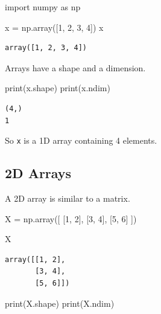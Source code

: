 \documentclass[
  letterpaper,
  DIV=11,
  numbers=noendperiod]{scrreprt}
\newenvironment{Shaded}{\begin{snugshade}}{\end{snugshade}}
\newcommand{\BuiltInTok}[1]{\textcolor[rgb]{0.00,0.23,0.31}{#1}}
\newcommand{\DecValTok}[1]{\textcolor[rgb]{0.68,0.00,0.00}{#1}}
\newcommand{\ImportTok}[1]{\textcolor[rgb]{0.00,0.46,0.62}{#1}}
\newcommand{\NormalTok}[1]{\textcolor[rgb]{0.00,0.23,0.31}{#1}}
\newcommand{\OperatorTok}[1]{\textcolor[rgb]{0.37,0.37,0.37}{#1}}
\theoremstyle{definition}
\theoremstyle{definition}
\theoremstyle{plain}
\theoremstyle{plain}
\theoremstyle{remark}
\begin{document}
\begin{Shaded}
\begin{Highlighting}[]
\ImportTok{import}\NormalTok{ numpy }\ImportTok{as}\NormalTok{ np}

\NormalTok{x }\OperatorTok{=}\NormalTok{ np.array([}\DecValTok{1}\NormalTok{, }\DecValTok{2}\NormalTok{, }\DecValTok{3}\NormalTok{, }\DecValTok{4}\NormalTok{])}
\NormalTok{x}
\end{Highlighting}
\end{Shaded}

\begin{verbatim}
array([1, 2, 3, 4])
\end{verbatim}

Arrays have a shape and a dimension.

\begin{Shaded}
\begin{Highlighting}[]
\BuiltInTok{print}\NormalTok{(x.shape)}
\BuiltInTok{print}\NormalTok{(x.ndim)}
\end{Highlighting}
\end{Shaded}

\begin{verbatim}
(4,)
1
\end{verbatim}

So \texttt{x} is a 1D array containing 4 elements.

\subsection{2D Arrays}\label{d-arrays}

A 2D array is similar to a matrix.

\begin{Shaded}
\begin{Highlighting}[]
\NormalTok{X }\OperatorTok{=}\NormalTok{ np.array([}
\NormalTok{    [}\DecValTok{1}\NormalTok{, }\DecValTok{2}\NormalTok{],}
\NormalTok{    [}\DecValTok{3}\NormalTok{, }\DecValTok{4}\NormalTok{],}
\NormalTok{    [}\DecValTok{5}\NormalTok{, }\DecValTok{6}\NormalTok{]}
\NormalTok{])}

\NormalTok{X}
\end{Highlighting}
\end{Shaded}

\begin{verbatim}
array([[1, 2],
       [3, 4],
       [5, 6]])
\end{verbatim}

\begin{Shaded}
\begin{Highlighting}[]
\BuiltInTok{print}\NormalTok{(X.shape)}
\BuiltInTok{print}\NormalTok{(X.ndim)}
\end{Highlighting}
\end{Shaded}
\end{document}
